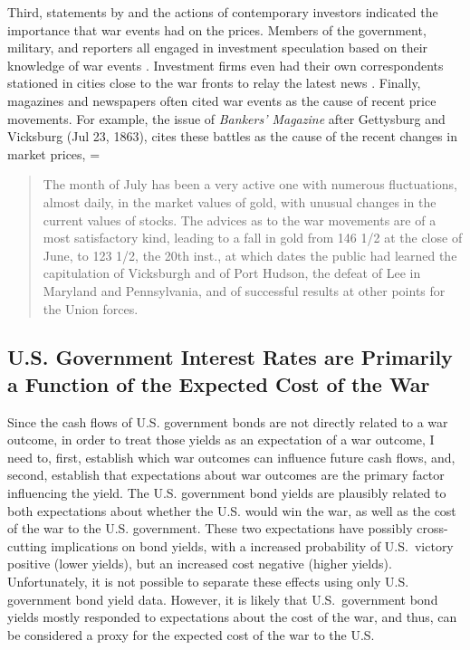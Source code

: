 Third, statements by and the actions of contemporary investors indicated the importance that war events had on the prices. %
Members of the government, military, and reporters all engaged in investment speculation based on their knowledge of war events \parencites[5-7]{Cornwallis1879}{Mitchell1903}[][1004]{WillardGuinnaneEtAl1996}.
Investment firms even had their own correspondents stationed in cities close to the war fronts to relay the latest news \parencites[5-7]{Cornwallis1879}. %
Finally, magazines and newspapers often cited war events as the cause of recent price movements. %
For example, the issue of \textit{Bankers' Magazine} after Gettysburg and Vicksburg (Jul 23, 1863), cites these battles as the cause of the recent changes in market prices,
=\begin{quote}
  The month of July has been a very active one with numerous fluctuations, almost daily, in the market values of gold, with unusual changes in the current values of stocks. %
  The advices as to the war movements are of a most satisfactory kind, leading to a fall in gold from 146 1/2 at the close of June, to 123 1/2, the 20th inst., at which dates the public had learned the  capitulation of Vicksburgh and of Port Hudson, the defeat of Lee in  Maryland and Pennsylvania, and of successful results at other points  for the Union forces. %
\parencite[159]{BankersMagazine1864}
\end{quote}



\subsection{U.S. Government Interest Rates are Primarily a Function of the Expected Cost of the War}
\label{bonds_battles:sec:u.s.-governm-inter}

Since the cash flows of U.S. government bonds are not directly related to a war outcome, in order to treat those yields as an expectation of a war outcome, I need to, first, establish which war outcomes can influence future cash flows, and, second, establish that expectations about war outcomes are the primary factor influencing the yield.
The U.S. government bond yields are plausibly related to both expectations about whether the U.S. would win the war, as well as the cost of the war to the U.S. government.
These two expectations have possibly cross-cutting implications on bond yields, with a increased probability of U.S.\ victory positive (lower yields), but an increased cost negative (higher yields).
Unfortunately, it is not possible to separate these effects using only U.S. government bond yield data.
However, it is likely that U.S.\ government bond yields mostly responded to expectations about the cost of the war, and thus, can be considered a proxy for the expected cost of the war to the U.S.

